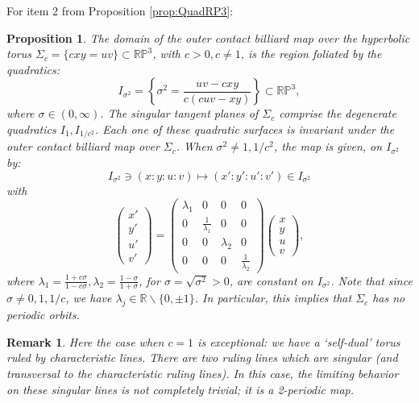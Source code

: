 \documentclass{article}
\newcommand{\R}{\mathbb{R}} %
\newtheorem{prop}{Proposition}[section]
\newtheorem{rmk}{Remark}
\begin{document}
\begin{appendix}
For item 2 from Proposition \ref{prop:QuadRP3}:

\begin{prop} \label{prop:HypTori}
The domain of the outer contact billiard map over the hyperbolic torus $\Sigma_c = \{ cxy = uv\}\subset\mathbb{RP}^3$, with $c>0, c\ne 1$, is the region foliated by the quadratics:
\[ I_{\sigma^2} = \left\{ \sigma^2=\dfrac{uv - cxy}{c(cuv -xy)} \right\} \subset\mathbb{RP}^3, \]
where $\sigma \in (0,\infty)$. The singular tangent planes of $\Sigma_c$ comprise the degenerate quadratics $I_1, I_{1/c^2}$. Each one of these quadratic surfaces is invariant under the outer contact billiard map over $\Sigma_c$. When $\sigma^2\ne 1, 1/c^2$, the map is given, on $I_{\sigma^2}$ by:
    \[ I_{\sigma^2}\ni (x:y:u:v)\mapsto (x':y':u':v') \in I_{\sigma^2} \]
    with
    \[ \begin{pmatrix}
    x' \\ y' \\ u' \\ v'
    \end{pmatrix} = \begin{pmatrix}
        \lambda_1 & 0 & 0 & 0 \\
        0 & \frac{1}{\lambda_1} & 0 & 0 \\
        0 & 0 & \lambda_2 & 0 \\
        0 & 0 & 0 & \frac{1}{\lambda_2}
    \end{pmatrix}\begin{pmatrix}
    x \\ y \\ u \\ v
    \end{pmatrix},\]
    where $\lambda_1 = \frac{1 + c\sigma}{1- c\sigma}, \lambda_2 = \frac{1-\sigma}{1+\sigma}$, for $\sigma = \sqrt{\sigma^2}>0$, are constant on $I_{\sigma^2}$. Note that since $\sigma\ne 0,  1, 1/c$, we have $\lambda_j\in \R\backslash \{0,\pm 1\}$.
    In particular, this implies that $\Sigma_c$ has no periodic orbits.
\end{prop}


\begin{rmk}
    Here the case when $c = 1$ is exceptional: we have a `self-dual' torus ruled by characteristic lines. There are two ruling lines which are singular (and transversal to the characteristic ruling lines). In this case, the limiting behavior on these singular lines is not completely trivial; it is a 2-periodic map. %
\end{rmk}


\end{appendix}
\end{document}
